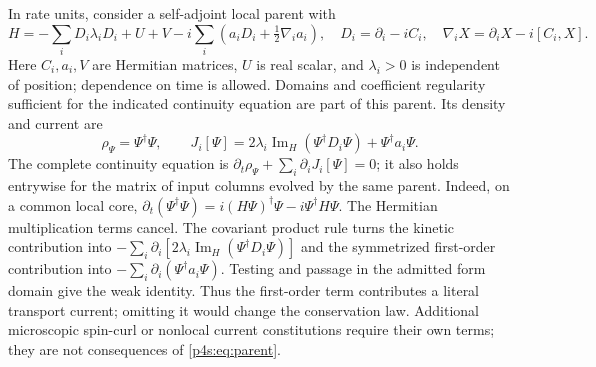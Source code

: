\documentclass[11pt]{article}
\numberwithin{equation}{section}
\theoremstyle{definition}
\theoremstyle{remark}
\begin{document}
In rate units, consider a self-adjoint local parent with
\begin{equation}\label{p4s:eq:parent}
 H=-\sum_i D_i\lambda_i D_i+U+V
       -i\sum_i\left(a_iD_i+\tfrac12\nabla_i a_i\right),
 \quad D_i=\partial_i-iC_i,\quad
 \nabla_i X=\partial_iX-i[C_i,X].
\end{equation}
Here $C_i,a_i,V$ are Hermitian matrices, $U$ is real scalar, and
$\lambda_i>0$ is independent of position; dependence on time is allowed.
Domains and coefficient regularity sufficient for the indicated
continuity equation are part of this parent. Its density and current are
\begin{equation}\label{p4s:eq:literalcurrent}
 \rho_\Psi=\Psi^\dagger\Psi,\qquad
 J_i[\Psi]=2\lambda_i\operatorname{Im}_{H}(\Psi^\dagger D_i\Psi)
                          +\Psi^\dagger a_i\Psi .
\end{equation}
The complete continuity equation is
$\partial_t\rho_\Psi+\sum_i\partial_iJ_i[\Psi]=0$; it also holds
entrywise for the matrix of input columns evolved by the same parent.
Indeed, on a common local core,
$\partial_t(\Psi^\dagger\Psi)=i(H\Psi)^\dagger\Psi-i\Psi^\dagger H\Psi$.
The Hermitian multiplication terms cancel. The covariant product rule
turns the kinetic contribution into
$-\sum_i\partial_i[2\lambda_i\operatorname{Im}_H(\Psi^\dagger D_i\Psi)]$
and the symmetrized first-order contribution into
$-\sum_i\partial_i(\Psi^\dagger a_i\Psi)$.
Testing and passage in the admitted form domain give the weak identity.
Thus the first-order term contributes a literal transport current;
omitting it would change the conservation law. Additional microscopic spin-curl or nonlocal
current constitutions require their own terms; they are not consequences
of \eqref{p4s:eq:parent}.
\end{document}
